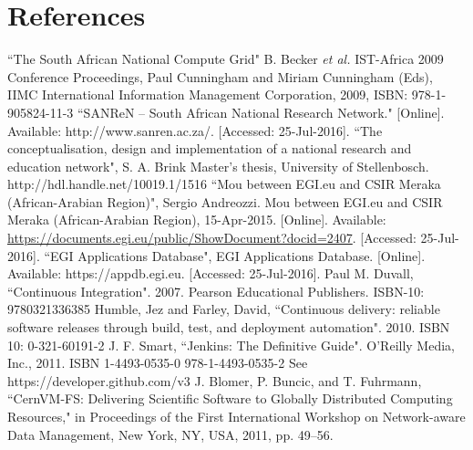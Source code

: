 \documentclass[a4paper]{jpconf}
\begin{document}
\section*{References}
\begin{thebibliography}{9}
  ``The South African National Compute Grid" B. Becker {\it et al.} IST-Africa 2009 Conference Proceedings, Paul Cunningham and Miriam Cunningham (Eds), IIMC International Information Management Corporation, 2009, ISBN: 978-1-905824-11-3
 ``SANReN – South African National Research Network." [Online]. Available: http://www.sanren.ac.za/. [Accessed: 25-Jul-2016].
 ``The conceptualisation, design and implementation of a national research and education network", S. A. Brink Master's thesis, University of Stellenbosch. http://hdl.handle.net/10019.1/1516
 ``Mou between EGI.eu and CSIR Meraka (African-Arabian Region)", Sergio Andreozzi. Mou between EGI.eu and CSIR Meraka (African-Arabian Region), 15-Apr-2015. [Online]. Available: \url{https://documents.egi.eu/public/ShowDocument?docid=2407}. [Accessed: 25-Jul-2016].
 ``EGI Applications Database", EGI Applications Database. [Online]. Available: https://appdb.egi.eu. [Accessed: 25-Jul-2016].
 Paul M. Duvall, ``Continuous Integration". 2007. Pearson Educational Publishers.  ISBN-10: 9780321336385
 Humble, Jez and Farley, David, ``Continuous delivery: reliable software releases through build, test, and deployment automation". 2010. ISBN 10: 0-321-60191-2
 J. F. Smart, ``Jenkins: The Definitive Guide". O’Reilly Media, Inc., 2011. ISBN 1-4493-0535-0 978-1-4493-0535-2
 See https://developer.github.com/v3
 J. Blomer, P. Buncic, and T. Fuhrmann, ``CernVM-FS: Delivering Scientific Software to Globally Distributed Computing Resources," in Proceedings of the First International Workshop on Network-aware Data Management, New York, NY, USA, 2011, pp. 49–56.
\end{thebibliography}


% 
\end{document}
